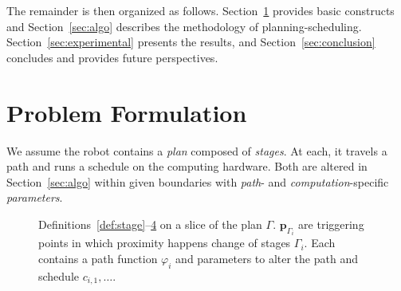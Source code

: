 \documentclass[letterpaper,10pt,journal,twoside]{IEEEtran}
\newcommand{\figpath}{./figures}
\theoremstyle{definition}
\begin{document}
The %
{\color{blue}remainder is} then organized as follows. Section~\ref{sec:prob} provides basic constructs%
{ \color{blue}and} %
Section~\ref{sec:algo} describes %
the methodology of planning-scheduling. Section~\ref{sec:experimental} presents the results, %
and Section~\ref{sec:conclusion} concludes and provides future perspectives. %

\vspace*{-1ex}
\section{Problem Formulation}  %
\label{sec:prob}               %
{\color{blue}W}e assume %
{\color{blue}the }robot contains a \emph{plan} composed of \emph{stages}. At each, %
{\color{blue}it }travels a path and runs a schedule on the computing hardware. Both are %
altered in Section~\ref{sec:algo} within given boundaries with \emph{path}- and \emph{computation}-specific \emph{parameters}.%

\begin{figure}[t]
  \footnotesize
  \begin{minipage}[l]{0.38\columnwidth}
    \caption{Definitions~\ref{def:stage}--\hyperref[def:plan]{4} on a slice of the plan $\Gamma$. $\mathbf{p}_{\Gamma_i}$ are triggering points in which proximity happens change of stages $\Gamma_i$. Each contains a path function $\varphi_i$ and parameters to alter the path and schedule $c_{i,1},\dots$.}
    \label{fig:traj1}
  \end{minipage}\hfill
  \begin{minipage}[c]{0.6\columnwidth}
    \centering
    \vspace*{-4ex}
    
  \end{minipage}
  \vspace*{-4.5ex}
\end{figure}
\end{document}
